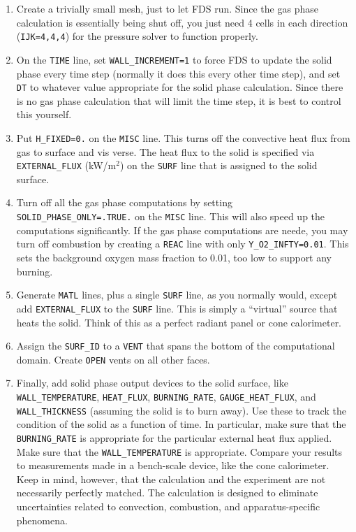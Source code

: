 \documentclass[11pt]{book}
\newcommand{\ct}{\tt\small}
\begin{document}
\begin{enumerate}
\item Create a trivially small mesh, just to let FDS run. Since the
gas phase calculation is essentially being shut off, you just need 4
cells in each direction ({\ct IJK=4,4,4}) for the pressure solver to
function properly.
\item On the {\ct TIME} line, set {\ct WALL\_INCREMENT=1} to force FDS
to update the solid phase every time step (normally it does this every
other time step), and set {\ct DT} to whatever value appropriate for
the solid phase calculation. Since there is no gas phase calculation
that will limit the time step, it is best to control this yourself.
\item Put {\ct H\_FIXED=0.} on the {\ct MISC} line. This turns off the
convective heat flux from gas to surface and vis verse. The heat flux
to the solid is specified via {\ct EXTERNAL\_FLUX} (kW/m$^2$) on the
{\ct SURF} line that is assigned to the solid surface.
\item Turn off all the gas phase computations by setting {\ct
SOLID\_PHASE\_ONLY=.TRUE.} on the {\ct MISC} line. This will also speed
up the computations significantly. If the gas phase computations are
neede, you may turn off combustion by creating a {\ct REAC} line with only
{\ct Y\_O2\_INFTY=0.01}. This sets the background oxygen mass fraction
to 0.01, too low to support any burning.
\item Generate {\ct MATL} lines, plus a single {\ct SURF} line, as you
normally would, except add {\ct EXTERNAL\_FLUX} to the {\ct SURF}
line. This is simply a ``virtual'' source that heats the solid. Think
of this as a perfect radiant panel or cone calorimeter.
\item Assign the {\ct SURF\_ID} to a {\ct VENT} that spans the bottom
of the computational domain. Create {\ct OPEN} vents on all other
faces.
\item Finally, add solid phase output devices to the solid surface,
like {\ct WALL\_TEMPERATURE}, {\ct HEAT\_FLUX}, {\ct BURNING\_RATE},
{\ct GAUGE\_HEAT\_FLUX}, and {\ct WALL\_THICKNESS} (assuming the solid
is to burn away). Use these to track the condition of the solid as a
function of time. In particular, make sure that the {\ct
BURNING\_RATE} is appropriate for the particular external heat flux
applied. Make sure that the {\ct WALL\_TEMPERATURE} is
appropriate. Compare your results to measurements made in a
bench-scale device, like the cone calorimeter. Keep in mind, however,
that the calculation and the experiment are not necessarily perfectly
matched. The calculation is designed to eliminate uncertainties
related to convection, combustion, and apparatus-specific phenomena.
\end{enumerate}
\end{document}
